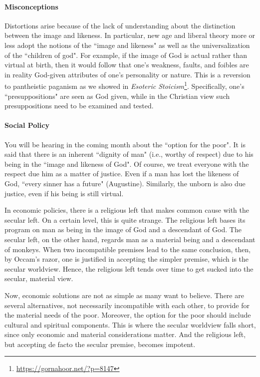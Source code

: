 \paragraph{Misconceptions}
Distortions arise because of the lack of understanding about the distinction between the image and likeness. In particular, new age and liberal theory more or less adopt the notions of the ``image and likeness" as well as the universalization of the ``children of god". For example, if the image of God is actual rather than virtual at birth, then it would follow that one's weakness, faults, and foibles are in reality God-given attributes of one's personality or nature. This is a reversion to pantheistic paganism as we showed in \textit{Esoteric Stoicism}\footnote{\url{https://gornahoor.net/?p=8147}}. Specifically, one's ``presuppositions" are seen as God given, while in the Christian view such presuppositions need to be examined and tested.

\paragraph{Social Policy}
You will be hearing in the coming month about the ``option for the poor". It is said that there is an inherent ``dignity of man" (i.e., worthy of respect) due to his being in the ``image and likeness of God". Of course, we treat everyone with the respect due him as a matter of justice. Even if a man has lost the likeness of God, ``every sinner has a future" (Augustine). Similarly, the unborn is also due justice, even if his being is still virtual.

In economic policies, there is a religious left that makes common cause with the secular left. On a certain level, this is quite strange. The religious left bases its program on man as being in the image of God and a descendant of God. The secular left, on the other hand, regards man as a material being and a descendant of monkeys. When two incompatible premises lead to the same conclusion, then, by Occam's razor, one is justified in accepting the simpler premise, which is the secular worldview. Hence, the religious left tends over time to get sucked into the secular, material view.

Now, economic solutions are not as simple as many want to believe. There are several alternatives, not necessarily incompatible with each other, to provide for the material needs of the poor. Moreover, the option for the poor should include cultural and spiritual components. This is where the secular worldview falls short, since only economic and material considerations matter. And the religious left, but accepting de facto the secular premise, becomes impotent.

